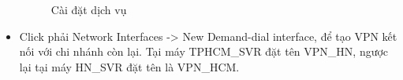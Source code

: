 \begin{itemize}
            \begin{figure}[h]
            \hfill
            \hfill
            \caption{Cài đặt dịch vụ}
        \end{figure}
        \newpage
        \item Click phải Network Interfaces -> New Demand-dial interface, để tạo VPN kết nối với chi nhánh còn lại. Tại máy TPHCM\_SVR đặt tên VPN\_HN, ngược lại tại máy HN\_SVR đặt tên là VPN\_HCM.
        \begin{figure}[htbp]
            \hfill

\end{figure}
\end{itemize}
